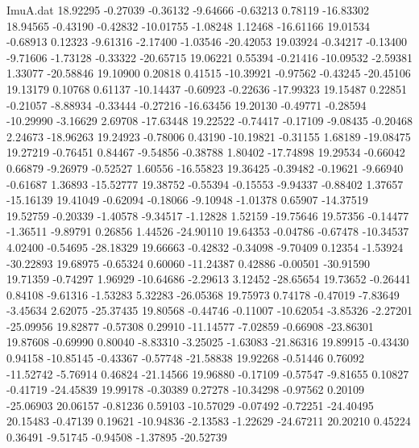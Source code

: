 \begin{filecontents}{ImuA.dat}
  18.92295   -0.27039   -0.36132   -9.64666   -0.63213    0.78119  -16.83302
  18.94565   -0.43190   -0.42832  -10.01755   -1.08248    1.12468  -16.61166
  19.01534   -0.68913    0.12323   -9.61316   -2.17400   -1.03546  -20.42053
  19.03924   -0.34217   -0.13400   -9.71606   -1.73128   -0.33322  -20.65715
  19.06221    0.55394   -0.21416  -10.09532   -2.59381    1.33077  -20.58846
  19.10900    0.20818    0.41515  -10.39921   -0.97562   -0.43245  -20.45106
  19.13179    0.10768    0.61137  -10.14437   -0.60923   -0.22636  -17.99323
  19.15487    0.22851   -0.21057   -8.88934   -0.33444   -0.27216  -16.63456
  19.20130   -0.49771   -0.28594  -10.29990   -3.16629    2.69708  -17.63448
  19.22522   -0.74417   -0.17109   -9.08435   -0.20468    2.24673  -18.96263
  19.24923   -0.78006    0.43190  -10.19821   -0.31155    1.68189  -19.08475
  19.27219   -0.76451    0.84467   -9.54856   -0.38788    1.80402  -17.74898
  19.29534   -0.66042    0.66879   -9.26979   -0.52527    1.60556  -16.55823
  19.36425   -0.39482   -0.19621   -9.66940   -0.61687    1.36893  -15.52777
  19.38752   -0.55394   -0.15553   -9.94337   -0.88402    1.37657  -15.16139
  19.41049   -0.62094   -0.18066   -9.10948   -1.01378    0.65907  -14.37519
  19.52759   -0.20339   -1.40578   -9.34517   -1.12828    1.52159  -19.75646
  19.57356   -0.14477   -1.36511   -9.89791    0.26856    1.44526  -24.90110
  19.64353   -0.04786   -0.67478  -10.34537    4.02400   -0.54695  -28.18329
  19.66663   -0.42832   -0.34098   -9.70409    0.12354   -1.53924  -30.22893
  19.68975   -0.65324    0.60060  -11.24387    0.42886   -0.00501  -30.91590
  19.71359   -0.74297    1.96929  -10.64686   -2.29613    3.12452  -28.65654
  19.73652   -0.26441    0.84108   -9.61316   -1.53283    5.32283  -26.05368
  19.75973    0.74178   -0.47019   -7.83649   -3.45634    2.62075  -25.37435
  19.80568   -0.44746   -0.11007  -10.62054   -3.85326   -2.27201  -25.09956
  19.82877   -0.57308    0.29910  -11.14577   -7.02859   -0.66908  -23.86301
  19.87608   -0.69990    0.80040   -8.83310   -3.25025   -1.63083  -21.86316
  19.89915   -0.43430    0.94158  -10.85145   -0.43367   -0.57748  -21.58838
  19.92268   -0.51446    0.76092  -11.52742   -5.76914    0.46824  -21.14566
  19.96880   -0.17109   -0.57547   -9.81655    0.10827   -0.41719  -24.45839
  19.99178   -0.30389    0.27278  -10.34298   -0.97562    0.20109  -25.06903
  20.06157   -0.81236    0.59103  -10.57029   -0.07492   -0.72251  -24.40495
  20.15483   -0.47139    0.19621  -10.94836   -2.13583   -1.22629  -24.67211
  20.20210    0.45224    0.36491   -9.51745   -0.94508   -1.37895  -20.52739

\end{filecontents}
